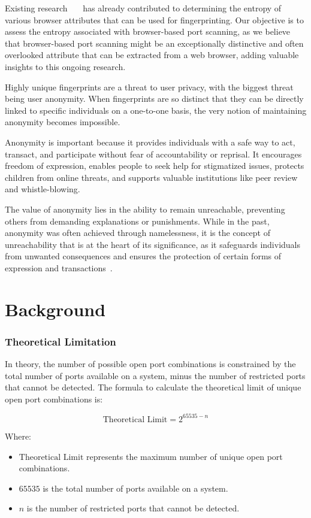 Existing research~\cite{gomez2018}~\cite{laperdrix2016}~\cite{eckersley2010} has already contributed to determining the entropy of various browser attributes that can be used for fingerprinting. Our objective is to assess the entropy associated with browser-based port scanning, as we believe that browser-based port scanning might be an exceptionally distinctive and often overlooked attribute that can be extracted from a web browser, adding valuable insights to this ongoing research.

Highly unique fingerprints are a threat to user privacy, with the biggest threat being user anonymity. When fingerprints are so distinct that they can be directly linked to specific individuals on a one-to-one basis, the very notion of maintaining anonymity becomes impossible.

Anonymity is important because it provides individuals with a safe way to act, transact, and participate without fear of accountability or reprisal. It encourages freedom of expression, enables people to seek help for stigmatized issues, protects children from online threats, and supports valuable institutions like peer review and whistle-blowing. 

The value of anonymity lies in the ability to remain unreachable, preventing others from demanding explanations or punishments. While in the past, anonymity was often achieved through namelessness, it is the concept of unreachability that is at the heart of its significance, as it safeguards individuals from unwanted consequences and ensures the protection of certain forms of expression and transactions~\cite{nissenbaum1999}.

\section{Background}

\subsubsection{Theoretical Limitation}

In theory, the number of possible open port combinations is constrained by the total number of ports available on a system, minus the number of restricted ports that cannot be detected. The formula to calculate the theoretical limit of unique open port combinations is:

\[
\text{Theoretical Limit} = 2^{65535 - n}
\]

Where:
\begin{itemize}
  \item \(\text{Theoretical Limit}\) represents the maximum number of unique open port combinations.
  \item \(65535\) is the total number of ports available on a system.
  \item \(n\) is the number of restricted ports that cannot be detected.
\end{itemize}

